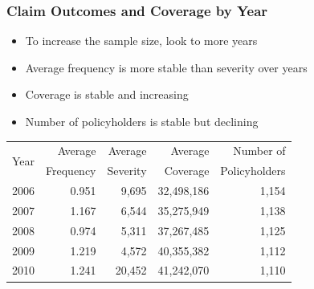 \documentclass[serif,10pt]{beamer}
\begin{document}
\begin{frame}
\frametitle{Claim Outcomes and Coverage by Year}
  \begin{itemize}
\item To increase the sample size, look to more years \vspace{2mm}
\item Average frequency is more stable than severity over years \vspace{2mm}
\item Coverage is stable and increasing \vspace{2mm}
\item Number of policyholders is stable but declining \vspace{2mm}
\end{itemize}
\begin{table}[htbp]
  \centering
    \begin{tabular}{l | rrrr}
    \hline
    \multirow{2}[4]{*}{Year} & Average & Average & Average & Number of \\
          & Frequency & Severity & Coverage & Policyholders \\
    \hline
      2006 &      0.951&     9,695 & 32,498,186 &       1,154 \\
      2007 &      1.167 &     6,544 & 35,275,949 &       1,138 \\
      2008 &      0.974 &     5,311 & 37,267,485 &       1,125 \\
      2009 &      1.219 &      4,572 & 40,355,382 &       1,112 \\
      2010 &      1.241 &     20,452 & 41,242,070 &       1,110 \\
    \hline
    \end{tabular}
  \label{T:CoverageBCIM}
\end{table}
\end{frame}
\end{document}

